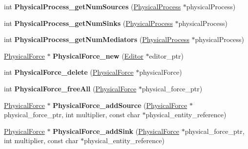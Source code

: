 \begin{DoxyCompactItemize}
\mbox{\label{namespaceomexmeta_aa7371fdf91f4c6c120e4559b23ad3585}} 
int {\bfseries Physical\+Process\+\_\+get\+Num\+Sources} (\hyperlink{classomexmeta_1_1PhysicalProcess}{Physical\+Process} $\ast$physical\+Process)
\item 
\mbox{\label{namespaceomexmeta_aaf4162aa78c2c7f73449705a3e0fc951}} 
int {\bfseries Physical\+Process\+\_\+get\+Num\+Sinks} (\hyperlink{classomexmeta_1_1PhysicalProcess}{Physical\+Process} $\ast$physical\+Process)
\item 
\mbox{\label{namespaceomexmeta_a7ad65f0ec2f5c8433ebc126c75779520}} 
int {\bfseries Physical\+Process\+\_\+get\+Num\+Mediators} (\hyperlink{classomexmeta_1_1PhysicalProcess}{Physical\+Process} $\ast$physical\+Process)
\item 
\mbox{\label{namespaceomexmeta_a20e720c23e2368bf19c316971ebeafd7}} 
\hyperlink{classomexmeta_1_1PhysicalForce}{Physical\+Force} $\ast$ {\bfseries Physical\+Force\+\_\+new} (\hyperlink{classomexmeta_1_1Editor}{Editor} $\ast$editor\+\_\+ptr)
\item 
\mbox{\label{namespaceomexmeta_aad5757f8832cf5fcaf546cec1f97af82}} 
int {\bfseries Physical\+Force\+\_\+delete} (\hyperlink{classomexmeta_1_1PhysicalForce}{Physical\+Force} $\ast$physical\+Force)
\item 
\mbox{\label{namespaceomexmeta_ac9903c88bb127f778476bdffe075ed8a}} 
int {\bfseries Physical\+Force\+\_\+free\+All} (\hyperlink{classomexmeta_1_1PhysicalForce}{Physical\+Force} $\ast$physical\+\_\+force\+\_\+ptr)
\item 
\mbox{\label{namespaceomexmeta_ae66097c6bfe2f6370bcb614a3d384a41}} 
\hyperlink{classomexmeta_1_1PhysicalForce}{Physical\+Force} $\ast$ {\bfseries Physical\+Force\+\_\+add\+Source} (\hyperlink{classomexmeta_1_1PhysicalForce}{Physical\+Force} $\ast$physical\+\_\+force\+\_\+ptr, int multiplier, const char $\ast$physical\+\_\+entity\+\_\+reference)
\item 
\mbox{\label{namespaceomexmeta_a75abc8bc74d8bacefd65935f49210343}} 
\hyperlink{classomexmeta_1_1PhysicalForce}{Physical\+Force} $\ast$ {\bfseries Physical\+Force\+\_\+add\+Sink} (\hyperlink{classomexmeta_1_1PhysicalForce}{Physical\+Force} $\ast$physical\+\_\+force\+\_\+ptr, int multiplier, const char $\ast$physical\+\_\+entity\+\_\+reference)

\end{DoxyCompactItemize}
